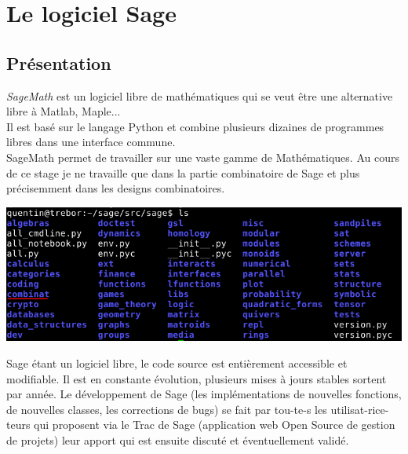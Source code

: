\documentclass[a4paper]{article}
\begin{document}
\newpage

\section{Le logiciel Sage}
\subsection{Présentation}
\textit{SageMath} est un logiciel libre de mathématiques qui se veut être une alternative libre à Matlab, Maple...\vspace{1\baselineskip}\\

Il est basé sur le langage Python et combine plusieurs dizaines de programmes libres dans une interface commune.\\
SageMath permet de travailler sur une vaste gamme de Mathématiques. Au cours de ce stage je ne travaille que dans la partie combinatoire de Sage et plus précisemment dans les designs combinatoires.
\vspace{3\baselineskip}
\begin{center}
  \includegraphics[scale=0.6]{matieres.jpg}
\end{center}
\vspace{3\baselineskip}
Sage étant un logiciel libre, le code source est entièrement accessible et modifiable. Il est en constante évolution, plusieurs mises à jours stables sortent par année. Le développement de Sage (les implémentations de nouvelles fonctions, de nouvelles classes, les corrections de bugs) se fait par tou-te-s les utilisat-rice-teurs qui proposent via le Trac de Sage (application web Open Source de gestion de projets) leur apport qui est ensuite discuté et éventuellement validé.
\newpage
\end{document}
